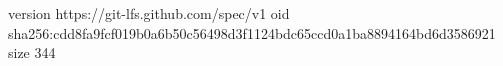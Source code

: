 version https://git-lfs.github.com/spec/v1
oid sha256:cdd8fa9fcf019b0a6b50c56498d3f1124bdc65ccd0a1ba8894164bd6d3586921
size 344
